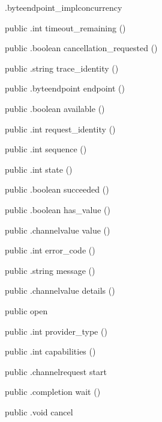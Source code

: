 \begin{CrexxClass}{.byteendpoint\_impl}{concurrency}
\begin{Members}
    \Method
      {public}
      {.int}
      {timeout\_remaining}
      {()}

    \Method
      {public}
      {.boolean}
      {cancellation\_requested}
      {()}

    \Method
      {public}
      {.string}
      {trace\_identity}
      {()}

    \Method
      {public}
      {.byteendpoint}
      {endpoint}
      {()}

    \Method
      {public}
      {.boolean}
      {available}
      {()}

    \Method
      {public}
      {.int}
      {request\_identity}
      {()}

    \Method
      {public}
      {.int}
      {sequence}
      {()}

    \Method
      {public}
      {.int}
      {state}
      {()}

    \Method
      {public}
      {.boolean}
      {succeeded}
      {()}

    \Method
      {public}
      {.boolean}
      {has\_value}
      {()}

    \Method
      {public}
      {.channelvalue}
      {value}
      {()}

    \Method
      {public}
      {.int}
      {error\_code}
      {()}

    \Method
      {public}
      {.string}
      {message}
      {()}

    \Method
      {public}
      {.channelvalue}
      {details}
      {()}

    \Factory
      {public}
      {open}
      {}

    \Method
      {public}
      {.int}
      {provider\_type}
      {()}

    \Method
      {public}
      {.int}
      {capabilities}
      {()}

    \Method
      {public}
      {.channelrequest}
      {start}
      {}

    \Method
      {public}
      {.completion}
      {wait}
      {()}

    \Method
      {public}
      {.void}
      {cancel}
      {}


\end{Members}
\end{CrexxClass}
